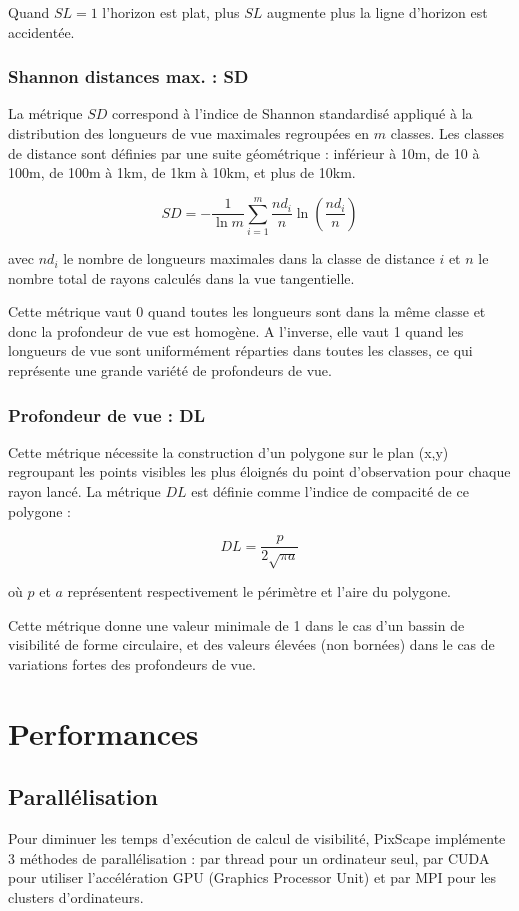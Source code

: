 \documentclass{report}
\begin{document}
Quand $SL=1$ l'horizon est plat, plus $SL$ augmente plus la ligne d'horizon est accidentée.

\subsection{Shannon distances max. : SD}
La métrique $SD$ correspond à l’indice de Shannon standardisé appliqué à la distribution des longueurs de vue maximales regroupées en $m$ classes. Les classes de distance sont définies par une suite géométrique : inférieur à 10m, de 10 à 100m, de 100m à 1km, de 1km à 10km, et plus de 10km.

$$SD = -\frac{1}{\ln m}\sum_{i=1}^{m}\frac{nd_i}{n}\ln\left(\frac{nd_i}{n}\right)$$

avec $nd_i$ le nombre de longueurs maximales dans la classe de distance $i$ et $n$ le nombre total de rayons calculés dans la vue tangentielle.

Cette métrique vaut 0 quand toutes les longueurs sont dans la même classe et donc la profondeur de vue est homogène. A l’inverse, elle vaut 1 quand les longueurs de vue sont uniformément réparties dans toutes les classes, ce qui représente une grande variété de profondeurs de vue.

\subsection{Profondeur de vue : DL}
Cette métrique nécessite la construction d’un polygone sur le plan (x,y) regroupant les points visibles les plus éloignés du point d’observation pour chaque rayon lancé. La métrique $DL$ est définie comme l’indice de compacité de ce polygone : 

$$DL=\frac{p}{2\sqrt{\pi a}}$$

où $p$ et $a$ représentent respectivement le périmètre et l’aire du polygone. 

Cette métrique donne une valeur minimale de 1 dans le cas d’un bassin de visibilité de forme circulaire, et des valeurs élevées (non bornées) dans le cas de variations fortes des profondeurs de vue.


\chapter{Performances}
\label{perf}

\section{Parallélisation}
\label{parallelism}
Pour diminuer les temps d'exécution de calcul de visibilité, PixScape implémente 3 méthodes de parallélisation : par thread pour un ordinateur seul, par CUDA pour utiliser l'accélération GPU (Graphics Processor Unit) et par MPI pour les clusters d'ordinateurs.
\end{document}
